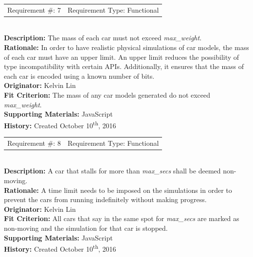 \documentclass[12pt, titlepage]{article}
\begin{document}
\begin{reqbox}
%
\begin{tabular}{cc}
Requirement \#: 7 & Requirement Type: Functional \\
\end{tabular} \\
%
\textbf{Description:} The mass of each car must not exceed \textit{max\_weight}. 
\\
\textbf{Rationale:} In order to have realistic physical simulations of car 
models, the mass of each car must have an upper limit. An upper limit reduces 
the possibility of type incompatibility with certain APIs. Additionally, it 
ensures that the mass of each car is encoded using a known number of bits.\\
\textbf{Originator:} Kelvin Lin\\
\textbf{Fit Criterion:} The mass of any car models generated do not exceed 
\textit{max\_weight}.\\
%  
\textbf{Supporting Materials:} JavaScript \\
\textbf{History:} Created October 10\textsuperscript{th}, 2016
%
\end{reqbox}

\begin{reqbox}
%
\begin{tabular}{cc}
Requirement \#: 8 & Requirement Type: Functional \\
\end{tabular} \\
%
\textbf{Description:} A car that stalls for more than \textit{max\_secs} shall 
be deemed non-moving. \\
\textbf{Rationale:} A time limit needs to be imposed on the simulations in order 
to prevent the cars from running indefinitely without making progress. \\
\textbf{Originator:} Kelvin Lin\\
\textbf{Fit Criterion:} All cars that say in the same spot for 
\textit{max\_secs} are marked as non-moving and the simulation for that car is 
stopped.\\
%  
\textbf{Supporting Materials:} JavaScript \\
\textbf{History:} Created October 10\textsuperscript{th}, 2016
%
\end{reqbox}

\newpage
\end{document}

